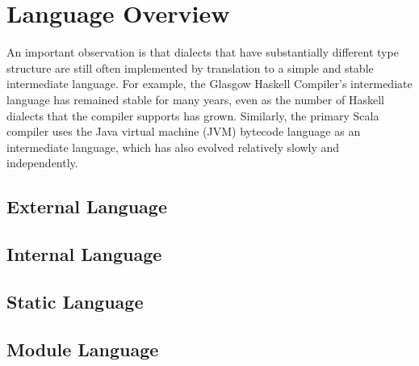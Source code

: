 \chapter{Language Overview}\label{chap:language-overview}
An important observation is that dialects that have substantially different type structure are still often implemented by translation to a simple and stable intermediate language. For example, the Glasgow Haskell Compiler's intermediate language has remained stable for many years, even as the number of Haskell dialects that the compiler supports has grown. Similarly, the primary Scala compiler uses the Java virtual machine (JVM) bytecode language as an intermediate language, which has also evolved relatively slowly and independently.
\section{External Language}\label{sec:EL-overview}
\section{Internal Language}\label{sec:IL-overview}
\section{Static Language}\label{sec:SL-overview}
\section{Module Language}\label{sec:ML-overview}


